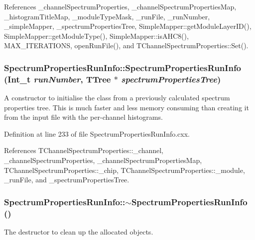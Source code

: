 References \_\-channelSpectrumProperties, \_\-channelSpectrumPropertiesMap, \_\-histogramTitleMap, \_\-moduleTypeMask, \_\-runFile, \_\-runNumber, \_\-simpleMapper, \_\-spectrumPropertiesTree, SimpleMapper::getModuleLayerID(), SimpleMapper::getModuleType(), SimpleMapper::isAHC8(), MAX\_\-ITERATIONS, openRunFile(), and TChannelSpectrumProperties::Set().\hypertarget{class_spectrum_properties_run_info_a282a3cf9cc345986c7e9852b8e8a23ec}{
\subsubsection[{SpectrumPropertiesRunInfo}]{\setlength{\rightskip}{0pt plus 5cm}SpectrumPropertiesRunInfo::SpectrumPropertiesRunInfo (Int\_\-t {\em runNumber}, \/  TTree $\ast$ {\em spectrumPropertiesTree})}}
\label{class_spectrum_properties_run_info_a282a3cf9cc345986c7e9852b8e8a23ec}


A constructor to initialise the class from a previously calculated spectrum properties tree. This is much faster and less memory consuming than creating it from the input file with the per-\/channel histograms. 

Definition at line 233 of file SpectrumPropertiesRunInfo.cxx.

References TChannelSpectrumProperties::\_\-channel, \_\-channelSpectrumProperties, \_\-channelSpectrumPropertiesMap, TChannelSpectrumProperties::\_\-chip, TChannelSpectrumProperties::\_\-module, \_\-runFile, and \_\-spectrumPropertiesTree.\hypertarget{class_spectrum_properties_run_info_a34cac3093acb09c6603bbbe941a1e496}{
\subsubsection[{$\sim$SpectrumPropertiesRunInfo}]{\setlength{\rightskip}{0pt plus 5cm}SpectrumPropertiesRunInfo::$\sim$SpectrumPropertiesRunInfo ()}}
\label{class_spectrum_properties_run_info_a34cac3093acb09c6603bbbe941a1e496}


The destructor to clean up the allocated objects. 

